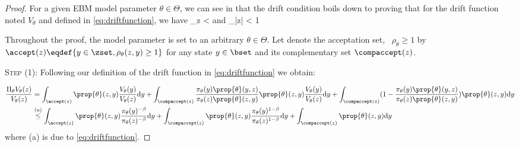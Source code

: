 \documentclass[10pt,twocolumn,letterpaper]{article}
\begin{document}
\begin{proof}
For a given EBM model parameter $\theta \in \Theta$, we can see in \cite{jarner2000geometric} that the drift condition boils down to proving that for the drift function noted $V_\theta$ and defined in \eqref{eq:driftfunction}, we have
\beq\label{mainproof}
\sup \limits_{z \in \zset}   < \infty \quad \textrm{and} \quad \lim \sup \limits_{|z| \to \infty}   < 1
\eeq

Throughout the proof, the model parameter is set to an arbitrary $\theta \in \Theta$.
Let denote the acceptation set, \ie\ $\rho_\theta \geq 1$ by $\accept(z) \eqdef \{ y \in \zset, \rho_\theta(z,y) \geq 1 \}$ for any state $y \in \bset$ and its complementary set $\compaccept(z)$.

\medskip
\noindent \textsc{Step (1): } Following our definition of the drift function in \eqref{eq:driftfunction} we obtain:

\begin{align}\label{eq:main1}
 \frac{\Pi_\theta V_\theta(z)}{V_\theta(z)} & = \int_{\accept(z)}  \prop{\theta}(z,y) \frac{V_\theta(y)}{V_\theta(z)} \textrm{d}y +  \int_{\compaccept(z)} \frac{\pi_\theta(y)\prop{\theta}(y,z)}{\pi_\theta(z)\prop{\theta}(z,y)} \prop{\theta}(z,y) \frac{V_\theta(y)}{V_\theta(z)} \textrm{d}y +  \int_{\compaccept(z)} (1 - \frac{\pi_\theta(y)\prop{\theta}(y,z)}{\pi_\theta(z)\prop{\theta}(z,y)}) \prop{\theta}(z,y)  \textrm{d}y\\
 &  \overset{(a)}{\leq} \int_{\accept(z)}  \prop{\theta}(z,y) \frac{\pi_\theta(y)^{-\beta}}{\pi_\theta(z)^{-\beta}} \textrm{d}y  + \int_{\compaccept(z)} \prop{\theta}(z,y) \frac{\pi_\theta(y)^{1-\beta}}{\pi_\theta(z)^{1-\beta}}\textrm{d}y +  \int_{\compaccept(z)} \prop{\theta}(z,y)  \textrm{d}y
\end{align}
where (a) is due to \eqref{eq:driftfunction}.


\end{proof}
\end{document}
